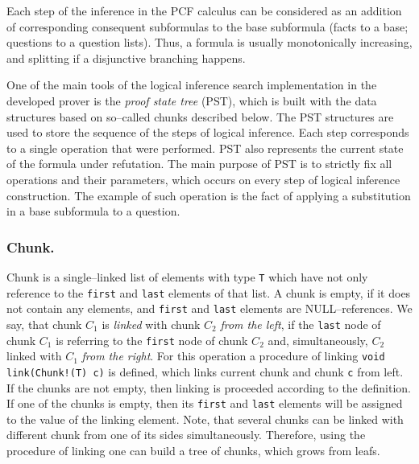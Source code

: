 \documentclass[runningheads,a4paper]{llncs}
\begin{document}

Each step of the inference in the PCF calculus can be considered as an addition of corresponding consequent subformulas to the base subformula (facts to a base; questions to a question lists). Thus, a formula is usually monotonically increasing, and splitting if a disjunctive branching happens.

One of the main tools of the logical inference search implementation in the developed prover is the \emph{proof state tree} (PST), which is built with the data structures based on so--called chunks described below. The PST structures are used to store the sequence of the steps of logical inference. Each step corresponds to a single operation that were performed. PST also represents the current state of the formula under refutation. The main purpose of PST is to strictly fix all operations and their parameters, which occurs on every step of logical inference construction. The example of such operation is the fact of applying a substitution in a base subformula to a question.

\subsubsection{Chunk.}
Chunk is a single--linked list of elements with type {\tt T} which have not only reference to the \texttt{first} and \texttt{last} elements of that list. A chunk is empty, if it does not contain any elements, and \texttt{first} and \texttt{last} elements are NULL--references. We say, that chunk $C_1$ is \emph{linked} with chunk $C_2$ \emph {from the left}, if the \texttt{last} node of chunk $C_1$ is referring to the \texttt{first} node of chunk $C_2$ and, simultaneously, $C_2$ linked with $C_1$ \emph{from the right}. For this operation a procedure of linking {\tt void link(Chunk!(T) c)} is defined, which links current chunk and chunk {\tt c} from left. If the chunks are not empty, then linking is proceeded according to the definition. If one of the chunks is empty, then its \texttt{first} and \texttt{last} elements will be assigned to the value of the linking element. Note, that several chunks can be linked with different chunk from one of its sides simultaneously. Therefore, using the procedure of linking one can build a tree of chunks, which grows from leafs.

\end{document}
